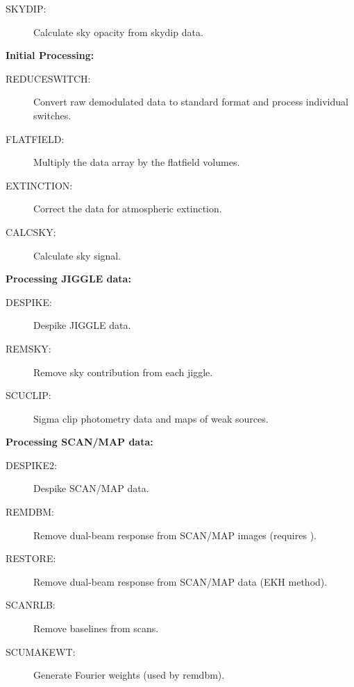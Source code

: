 \documentclass[twoside,11pt]{article}
\newcommand{\Kappa}{\xref{{\sc{Kappa}}}{sun95}{}}
\newcommand{\task}[1]{{\sf #1}}
\newcommand{\remdbm}{\htmlref{\task{remdbm}}{REMDBM}}
\newcommand{\htmlref}[2]{#1}
\newcommand{\xref}[3]{#1}
\renewcommand{\_}{\texttt{\symbol{95}}}
\begin{document}
\begin{description}
\begin{description}
\item[\htmlref{SKYDIP}{SKYDIP}:] Calculate sky opacity from skydip data.

\end{description}

\item \textbf{Initial Processing:}

\begin{description}

\item[\htmlref{REDUCE\_SWITCH}{REDUCE_SWITCH}:] Convert raw demodulated data
to standard format and process individual switches.

\item[\htmlref{FLATFIELD}{FLATFIELD}:] Multiply the data array by the
flatfield volumes.

\item[\htmlref{EXTINCTION}{EXTINCTION}:] Correct the data for atmospheric
extinction. 

\item[\htmlref{CALCSKY}{CALCSKY}:] Calculate sky signal.

\end{description}

\item \textbf{Processing JIGGLE data:}

\begin{description}

\item[\htmlref{DESPIKE}{DESPIKE}:] Despike JIGGLE data.

\item[\htmlref{REMSKY}{REMSKY}:] Remove sky contribution from each jiggle.

\item[\htmlref{SCUCLIP}{SCUCLIP}:] Sigma clip photometry data and maps of
weak sources.

\end{description}

\item \textbf{Processing SCAN/MAP data:}

\begin{description}
\item[\htmlref{DESPIKE2}{DESPIKE2}:] Despike SCAN/MAP data.
\item[\htmlref{REMDBM}{REMDBM}:] Remove dual-beam response from SCAN/MAP
images (requires \Kappa).
\item[\htmlref{RESTORE}{RESTORE}:] Remove dual-beam response from SCAN/MAP
data (EKH method). 
\item[\htmlref{SCAN\_RLB}{SCAN_RLB}:] Remove baselines from scans.
\item[\htmlref{SCUMAKEWT}{SCUMAKEWT}:] Generate Fourier weights (used by
\remdbm).
\end{description}


\end{description}
\end{document}
